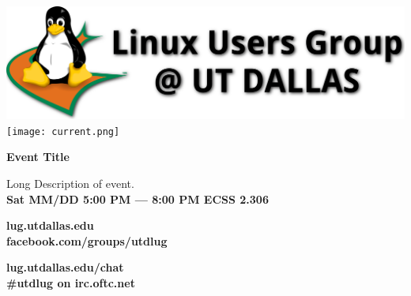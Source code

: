 \documentclass[letterpaper, oneside]{article}
\begin{document}
\noindent\includegraphics[width=\textwidth]{logo.png}
%
\noindent\texttt{[image: current.png]}
\Large
{\selectfont
	\begin{center}
		\Huge\textbf{Event Title}\\
	\end{center}
	\LARGE
	\begin{center}
		Long Description of event.\\\bigskip
		\Huge
		\textbf{Sat MM/DD 5:00 PM --- 8:00 PM ECSS 2.306}
	\end{center}
}
\Large
\color{white}
\begin{center}
	\colorbox{utdgreen}
	{\parbox{0.48\textwidth}
		{\selectfont
			{
				\begin{center}
					\textbf{lug.utdallas.edu\\
						facebook.com/groups/utdlug}
				\end{center}
			}
		}
	}
	\colorbox{utdorange}
	{\parbox{0.48\textwidth}
		{\selectfont
			{
				\begin{center}
					\textbf{lug.utdallas.edu/chat\\
						\#utdlug on irc.oftc.net}
				\end{center}
			}
		}
	}
\end{center}
\end{document}
